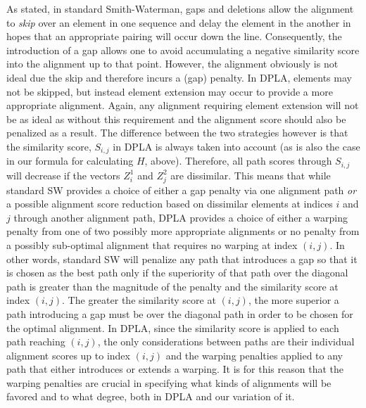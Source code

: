 \documentclass[12pt]{report} 	%
\numberwithin{figure}{chapter}
\numberwithin{table}{chapter}
\numberwithin{equation}{chapter}
\begin{document}
\begin{flushleft}
As stated, in standard Smith-Waterman, gaps and deletions allow the alignment to \textit{skip} over an element in one sequence and delay the element in the another in hopes that an appropriate pairing will occur down the line. Consequently, the introduction of a gap allows one to avoid accumulating a negative similarity score into the alignment up to that point. However, the alignment obviously is not ideal due the skip and therefore incurs a (gap) penalty. In DPLA, elements may not be skipped, but instead element extension may occur to provide a more appropriate alignment. Again, any alignment requiring element extension will not be as ideal as without this requirement and the alignment score should also be penalized as a result. The difference between the two strategies however is that the similarity score, $S_{i,j}$ in DPLA is always taken into account (as is also the case in our formula for calculating $H$, above). Therefore, all path scores through $S_{i,j}$ will decrease if the vectors $Z_i^1$ and $Z_j^2$ are dissimilar. This means that while standard SW provides a choice of either a gap penalty via one alignment path \textit{or} a possible alignment score reduction based on dissimilar elements at indices $i$ and $j$ through another alignment path, DPLA provides a choice of either a warping penalty from one of two possibly more appropriate alignments or no penalty from a possibly sub-optimal alignment that requires no warping at index $(i,j)$. In other words, standard SW will penalize any path that introduces a gap so that it is chosen as the best path only if the superiority of that path over the diagonal path is greater than the magnitude of the penalty and the similarity score at index $(i,j)$. The greater the similarity score at $(i,j)$, the more superior a path introducing a gap must be over the diagonal path in order to be chosen for the optimal alignment. In DPLA, since the similarity score is applied to each path reaching $(i,j)$, the only considerations between paths are their individual alignment scores up to index $(i,j)$ and the warping penalties applied to any path that either introduces or extends a warping. It is for this reason that the warping penalties are crucial in specifying what kinds of alignments will be favored and to what degree, both in DPLA and our variation of it.


\end{flushleft}
\end{document}
